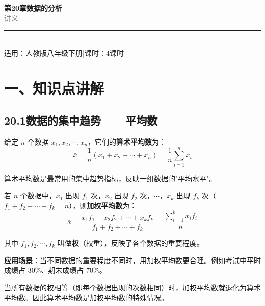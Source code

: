 \documentclass[12pt, a4paper]{ctexart}
\begin{document}
\begin{center}
{\Huge\bfseries\textcolor{mainblue}{第20章\quad 数据的分析}}\\[12pt]
{\Large\textcolor{gray}{讲\quad 义}}\\[8pt]
\rule{0.6\textwidth}{1pt}\\[8pt]
{\normalsize 适用：人教版\quad 八年级下册\quad |\quad 课时：4课时}
\end{center}
\vspace{10pt}

\section*{\textcolor{mainblue}{一、知识点讲解}}

\subsection*{20.1\quad 数据的集中趋势——平均数}

\begin{knowledgebox}[算术平均数]
给定 $n$ 个数据 $x_1, x_2, \cdots, x_n$，它们的\textbf{算术平均数}为：
$$\bar{x} = \frac{1}{n}(x_1 + x_2 + \cdots + x_n) = \frac{1}{n}\sum_{i=1}^{n} x_i$$

算术平均数是最常用的集中趋势指标，反映一组数据的"平均水平"。
\end{knowledgebox}

\begin{knowledgebox}[加权平均数]
若 $n$ 个数据中，$x_1$ 出现 $f_1$ 次，$x_2$ 出现 $f_2$ 次，$\cdots$，$x_k$ 出现 $f_k$ 次（$f_1 + f_2 + \cdots + f_k = n$），则\textbf{加权平均数}为：
$$\bar{x} = \frac{x_1 f_1 + x_2 f_2 + \cdots + x_k f_k}{f_1 + f_2 + \cdots + f_k} = \frac{\sum_{i=1}^{k} x_i f_i}{n}$$

其中 $f_1, f_2, \cdots, f_k$ 叫做\textbf{权}（权重），反映了各个数据的重要程度。

\medskip
\textbf{应用场景}：当不同数据的重要程度不同时，用加权平均数更合理。例如考试中平时成绩占 $30\%$、期末成绩占 $70\%$。
\end{knowledgebox}

\begin{tipbox}[加权平均数与算术平均数的关系]
当所有数据的权相等（即每个数据出现的次数相同）时，加权平均数就退化为算术平均数。因此算术平均数是加权平均数的特殊情况。
\end{tipbox}
\end{document}
